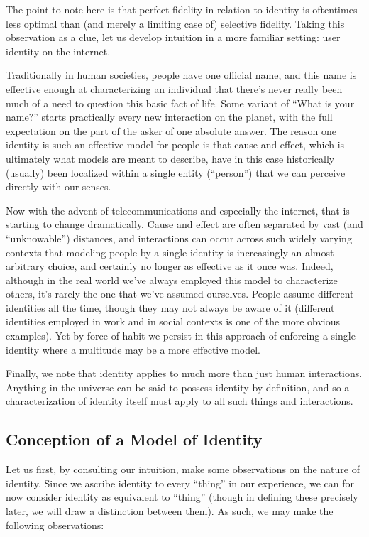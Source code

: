 \documentclass[pra,twocolumn,groupedaddress,10pt]{revtex4}
\theoremstyle{definition}
\begin{document}
The point to note here is that perfect fidelity in relation to identity is oftentimes less optimal than (and merely a limiting case of) selective fidelity. Taking this observation as a clue, let us develop intuition in a more familiar setting: user identity on the internet.

Traditionally in human societies, people have one official name, and this name is effective enough at characterizing an individual that there's never really been much of a need to question this basic fact of life. Some variant of ``What is your name?'' starts practically every new interaction on the planet, with the full expectation on the part of the asker of one absolute answer. The reason one identity is such an effective model for people is that cause and effect, which is ultimately what models are meant to describe, have in this case historically (usually) been localized within a single entity (``person'') that we can perceive directly with our senses.

Now with the advent of telecommunications and especially the internet, that is starting to change dramatically. Cause and effect are often separated by vast (and ``unknowable'') distances, and interactions can occur across such widely varying contexts that modeling people by a single identity is increasingly an almost arbitrary choice, and certainly no longer as effective as it once was. Indeed, although in the real world we've always employed this model to characterize others, it's rarely the one that we've assumed ourselves. People assume different identities all the time, though they may not always be aware of it (different identities employed in work and in social contexts is one of the more obvious examples). Yet by force of habit we persist in this approach of enforcing a single identity where a multitude may be a more effective model.

Finally, we note that identity applies to much more than just human interactions. Anything in the universe can be said to possess identity by definition, and so a characterization of identity itself must apply to all such things and interactions.

\subsection{Conception of a Model of Identity} \label{sec:conmodide}

Let us first, by consulting our intuition, make some observations on the nature of identity. Since we ascribe identity to every ``thing'' in our experience, we can for now consider identity as equivalent to ``thing'' (though in defining these precisely later, we will draw a distinction between them). As such, we may make the following observations:
\end{document}
